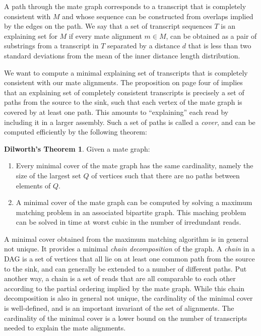 \documentclass[twocolumn]{homework}
\theoremstyle{definition}
\begin{document}
A path through the mate graph corresponds to a transcript that is completely consistent with $M$ and whose sequence can be constructed from overlaps implied by the edges on the path.  We say that a set of transcript sequences $T$ is an explaining set for $M$ if every mate alignment $m \in M$, can be obtained as a pair of substrings from a transcript in $T$ separated by a distance $d$ that is less than two standard deviations from the mean of the inner distance length distribution. 

We want to compute a minimal explaining set of transcripts that is completely consistent with our mate alignments.  The proposition on page four of \cite{Eriksson:2008p1143} implies that an explaining set of completely consistent transcripts is precisely a set of paths from the source to the sink, such that each vertex of the mate graph is covered by at least one path.  This amounts to ``explaining'' each read by including it in a larger assembly.  Such a set of paths is called a \emph{cover}, and can be computed efficiently by the following theorem:

\theoremstyle{theorem}
\newtheorem*{DL}{Dilworth's Theorem}
\begin{DL}
    Given a mate graph: 
    \begin{enumerate}
        \item Every minimal cover of the mate graph has the same cardinality, namely the size of the largest set $Q$ of vertices such that there are no paths between elements of $Q$.
      
        \item A minimal cover of the mate graph can be computed by solving a maximum matching problem in an associated bipartite graph.  This maching problem can be solved in time at worst cubic in the number of irredundant reads.
    \end{enumerate}
\end{DL}

A minimal cover obtained from the maximum matching algorithm is in general not unique.  It provides a minimal \emph{chain decomposition} of the graph.  A \emph{chain} in a DAG is a set of vertices that all lie on at least one common path from the source to the sink, and can generally be extended to a number of different paths. Put another way, a chain is a set of reads that are all comparable to each other according to the partial ordering implied by the mate graph. While this chain decomposition is also in general not unique, the cardinality of the minimal cover is well-defined, and is an important invariant of the set of alignments.  The cardinality of the minimal cover is a lower bound on the number of transcripts needed to explain the mate alignments.
\end{document}
